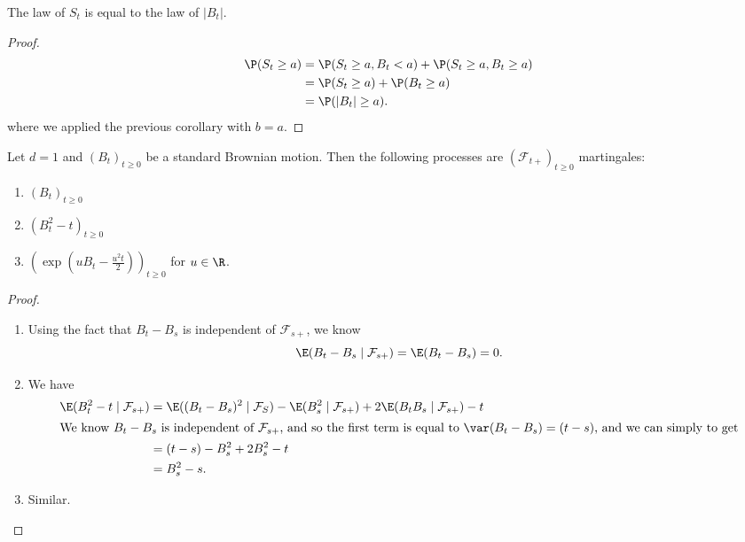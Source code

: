 \documentclass[a4paper]{article}
\begin{document}
\begin{cor}
  The law of $S_t$ is equal to the law of $|B_t|$.
\end{cor}

\begin{proof}
  \begin{align*}
    \P(S_t \geq a) &= \P(S_t \geq a, B_t < a) + \P(S_t \geq a, B_t \geq a)\\
    &= \P(S_t \geq a) + \P(B_t \geq a)\\
    &= \P(|B_t| \geq a).
  \end{align*}
  where we applied the previous corollary with $b = a$.
\end{proof}

\begin{prop}
  Let $d = 1$ and $(B_t)_{t \geq 0}$ be a standard Brownian motion. Then the following processes are $(\mathcal{F}_{t+})_{t \geq 0}$ martingales:
  \begin{enumerate}
    \item $(B_t)_{t \geq 0}$
    \item $(B_t^2 - t)_{t \geq 0}$
    \item $\left(\exp\left(u B_t - \frac{u^2 t}{2}\right)\right)_{t \geq 0}$ for $u \in \R$.
  \end{enumerate}
\end{prop}

\begin{proof}\leavevmode
  \begin{enumerate}
    \item Using the fact that $B_t - B_s$ is independent of $\mathcal{F}_{s+}$, we know
      \[
        \E (B_t - B_s \mid \mathcal{F}_{s+}) = \E (B_t - B_s) = 0.
      \]
    \item We have
      \begin{align*}
        \E (B_t^2 - t \mid \mathcal{F}_{s+}) &= \E ((B_t - B_s)^2 \mid \mathcal{F}_S)- \E(B_s^2 \mid \mathcal{F}_{s+}) + 2 \E(B_t B_s \mid \mathcal{F}_{s+}) - t\\
        \intertext{We know $B_t - B_s$ is independent of $\mathcal{F}_{s+}$, and so the first term is equal to $\var(B_t - B_s) = (t - s)$, and we can simply to get}
        &= (t - s) - B_s^2 + 2 B_s^2 - t\\
        &= B_s^2 - s.
      \end{align*}
    \item Similar.\qedhere
  \end{enumerate}
\end{proof}
\end{document}
